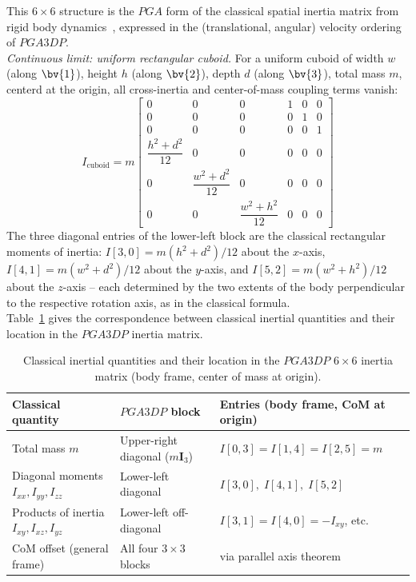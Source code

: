This $6\times6$ structure is the $PGA$ form of the classical spatial inertia matrix from
rigid body dynamics~\cite{Dynamics_in_PGA_plane-based_Dorst-DeKennik:2023}, expressed in
the (translational, angular) velocity ordering of $PGA3DP$. \\

\emph{Continuous limit: uniform rectangular cuboid.} For a uniform cuboid of width $w$
(along $\bv{1}$), height $h$ (along $\bv{2}$), depth $d$ (along $\bv{3}$), total mass $m$,
centerd at the origin, all cross-inertia and center-of-mass coupling terms vanish:
\begin{equation}
    I_\mathrm{cuboid} = m
    \begin{bmatrix}
        0 & 0 & 0 & 1 & 0 & 0 \\[4pt]
        0 & 0 & 0 & 0 & 1 & 0 \\[4pt]
        0 & 0 & 0 & 0 & 0 & 1 \\[4pt]
        \dfrac{h^2+d^2}{12} & 0 & 0 & 0 & 0 & 0 \\[10pt]
        0 & \dfrac{w^2+d^2}{12} & 0 & 0 & 0 & 0 \\[10pt]
        0 & 0 & \dfrac{w^2+h^2}{12} & 0 & 0 & 0
    \end{bmatrix}
    \label{eq:inertia_cuboid}
\end{equation}
The three diagonal entries of the lower-left block are the classical rectangular moments
of inertia: $I[3,0] = m(h^2+d^2)/12$ about the $x$-axis, $I[4,1] = m(w^2+d^2)/12$ about
the $y$-axis, and $I[5,2] = m(w^2+h^2)/12$ about the $z$-axis -- each determined by the
two extents of the body perpendicular to the respective rotation axis, as in the classical
formula. \\

Table~\ref{tab:classical_pga3dp} gives the correspondence between classical inertial
quantities and their location in the $PGA3DP$ inertia matrix.

\begin{table}[h!]
\centering\small
\begin{tabular}{p{3.1cm}|p{4.6cm}|p{4.7cm}}
\hline
Classical quantity & $PGA3DP$ block & Entries (body frame, CoM at origin) \\
\hline
Total mass $m$ & Upper-right diagonal ($m\mathbf{I}_3$) & $I[0,3]=I[1,4]=I[2,5]=m$ \\
Diagonal moments $I_{xx}, I_{yy}, I_{zz}$ & Lower-left diagonal & $I[3,0],\; I[4,1],\;
I[5,2]$ \\
Products of inertia $I_{xy}, I_{xz}, I_{yz}$ & Lower-left off-diagonal &
$I[3,1]=I[4,0]=-I_{xy}$, etc. \\
CoM offset (general frame) & All four $3\times3$ blocks & via parallel axis theorem \\
\hline
\end{tabular}
\caption{Classical inertial quantities and their location in the $PGA3DP$ $6\times6$
inertia matrix (body frame, center of mass at origin).}
\label{tab:classical_pga3dp}
\end{table}

